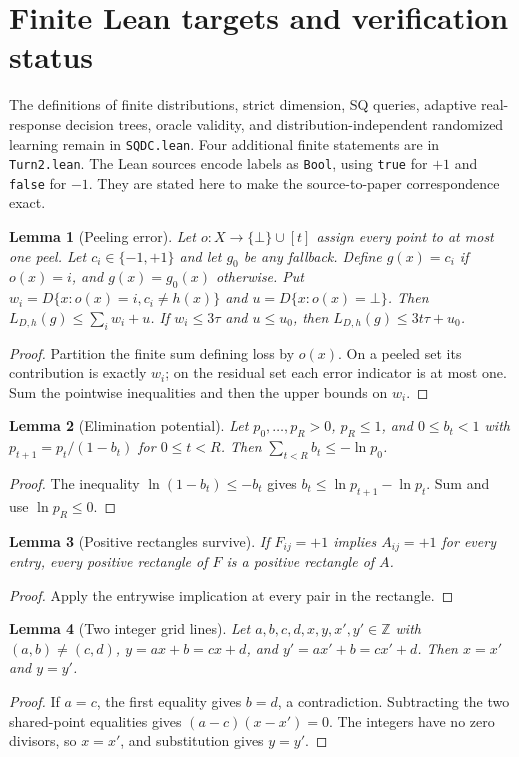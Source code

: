 \documentclass[11pt]{article}
\newtheorem{leanlemma}{Lemma}
\newcommand{\1}{\mathbf 1}
\begin{document}
\section{Finite Lean targets and verification status}
The definitions of finite distributions, strict dimension, SQ queries, adaptive real-response decision trees, oracle validity, and distribution-independent randomized learning remain in \texttt{SQDC.lean}. Four additional finite statements are in \texttt{Turn2.lean}. The Lean sources encode labels as \texttt{Bool}, using \texttt{true} for $+1$ and \texttt{false} for $-1$. They are stated here to make the source-to-paper correspondence exact.

\begin{leanlemma}[Peeling error]
Let $o:X\to\{\bot\}\cup[t]$ assign every point to at most one peel. Let $c_i\in\{-1,+1\}$ and let $g_0$ be any fallback. Define $g(x)=c_i$ if $o(x)=i$, and $g(x)=g_0(x)$ otherwise. Put $w_i=D\{x:o(x)=i,c_i\ne h(x)\}$ and $u=D\{x:o(x)=\bot\}$. Then $L_{D,h}(g)\le\sum_iw_i+u$. If $w_i\le3\tau$ and $u\le u_0$, then $L_{D,h}(g)\le3t\tau+u_0$.
\end{leanlemma}
\begin{proof}
Partition the finite sum defining loss by $o(x)$. On a peeled set its contribution is exactly $w_i$; on the residual set each error indicator is at most one. Sum the pointwise inequalities and then the upper bounds on $w_i$.
\end{proof}
\begin{leanlemma}[Elimination potential]
Let $p_0,\ldots,p_R>0$, $p_R\le1$, and $0\le b_t<1$ with $p_{t+1}=p_t/(1-b_t)$ for $0\le t<R$. Then $\sum_{t<R}b_t\le-\ln p_0$.
\end{leanlemma}
\begin{proof}
The inequality $\ln(1-b_t)\le-b_t$ gives $b_t\le\ln p_{t+1}-\ln p_t$. Sum and use $\ln p_R\le0$.
\end{proof}
\begin{leanlemma}[Positive rectangles survive]
If $F_{ij}=+1$ implies $A_{ij}=+1$ for every entry, every positive rectangle of $F$ is a positive rectangle of $A$.
\end{leanlemma}
\begin{proof}
Apply the entrywise implication at every pair in the rectangle.
\end{proof}
\begin{leanlemma}[Two integer grid lines]
Let $a,b,c,d,x,y,x',y'\in\mathbb Z$ with $(a,b)\ne(c,d)$, $y=ax+b=cx+d$, and $y'=ax'+b=cx'+d$. Then $x=x'$ and $y=y'$.
\end{leanlemma}
\begin{proof}
If $a=c$, the first equality gives $b=d$, a contradiction. Subtracting the two shared-point equalities gives $(a-c)(x-x')=0$. The integers have no zero divisors, so $x=x'$, and substitution gives $y=y'$.
\end{proof}
\end{document}
